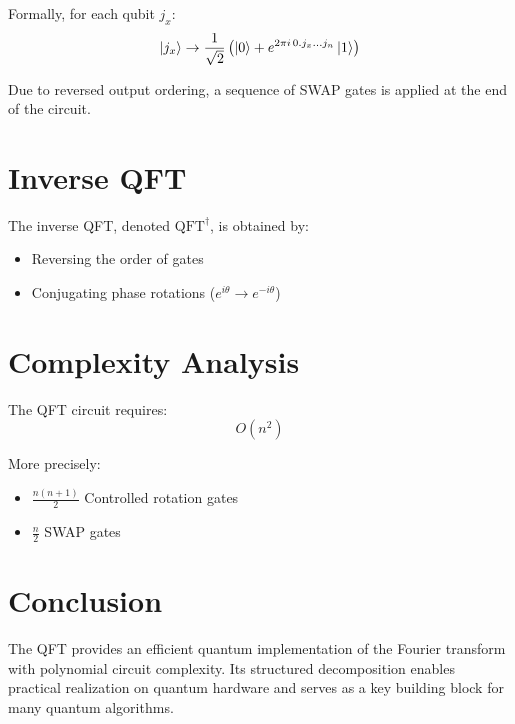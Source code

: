 \documentclass[conference]{IEEEtran}
\begin{document}
Formally, for each qubit $j_x$:
\begin{equation}
\ket{j_x} \rightarrow
\frac{1}{\sqrt{2}}
\left(
\ket{0} + e^{2\pi i \, 0.j_x \dots j_n} \ket{1}
\right)\label{eq:equation8}
\end{equation}

Due to reversed output ordering, a sequence of SWAP gates is applied at the end of the circuit.

\section{Inverse QFT}\label{sec:inverse-qft}

The inverse QFT, denoted $\mathrm{QFT}^\dagger$, is obtained by:

\begin{itemize}
    \item Reversing the order of gates
    \item Conjugating phase rotations ($e^{i\theta} \rightarrow e^{-i\theta}$)
\end{itemize}

\section{Complexity Analysis}\label{sec:complexity-analysis}

The QFT circuit requires:
\begin{equation}
O(n^2)\label{eq:equation9}
\end{equation}

More precisely:
\begin{itemize}
    \item $\frac{n(n+1)}{2}$ Controlled rotation gates
    \item $\frac{n}{2}$ SWAP gates
\end{itemize}

\section{Conclusion}\label{sec:conclusion}

The QFT provides an efficient quantum implementation of the Fourier transform with polynomial circuit complexity. Its structured decomposition enables practical realization on quantum hardware and serves as a key building block for many quantum algorithms.
\end{document}
